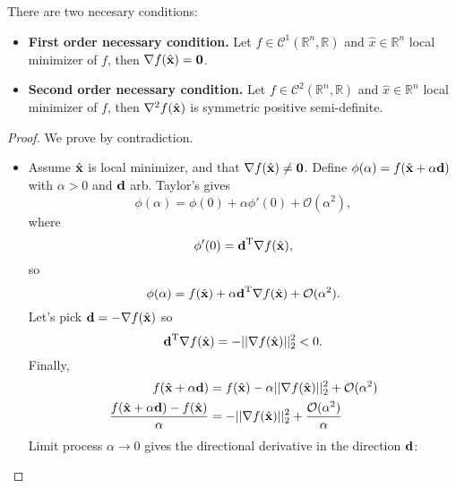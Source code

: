 \documentclass{article}
\begin{document}
\begin{theorem}
There are two necesary conditions:
    \begin{itemize}
        \item \textbf{First order necessary condition.} Let $f\in\mathcal{C}^1(\mathbb{R}^n,\mathbb{R})$ and $\hat{x}\in\mathbb{R}^n$ local minimizer of $f$, then $\nabla f(\hat{\bm{\mathrm{x}}})=\bm{\mathrm{0}}$.
        \item \textbf{Second order necessary condition.} Let $f\in\mathcal{C}^2(\mathbb{R}^n,\mathbb{R})$ and $\hat{x}\in\mathbb{R}^n$ local minimizer of $f$, then $\nabla^2 f(\hat{\bm{\mathrm{x}}})$ is symmetric positive semi-definite.
    \end{itemize}
\end{theorem}
\begin{proof}
    We prove by contradiction.
    \begin{itemize}
        \item Assume $\hat{\bm{\mathrm{x}}}$ is local minimizer, and that $\nabla f(\hat{\bm{\mathrm{x}}})\neq\bm{\mathrm{0}}$. Define $\phi(\alpha)=f(\hat{\bm{\mathrm{x}}}+\alpha\bm{\mathrm{d}})$ with $\alpha>0$ and $\bm{\mathrm{d}}$ arb. Taylor's gives
        \begin{equation}
            \phi(\alpha)=\phi(0)+\alpha\phi'(0)+\mathcal{O}(\alpha^2),
        \end{equation}
        where
        \begin{equation}
            \phi'(0)=\bm{\mathrm{d}}^{\text{T}}\nabla f(\hat{\bm{\mathrm{x}}}),
        \end{equation}
        so
        \begin{equation}
            \phi(\alpha)=f(\hat{\bm{\mathrm{x}}})+\alpha \bm{\mathrm{d}}^{\text{T}}\nabla f(\hat{\bm{\mathrm{x}}})+\mathcal{O}(\alpha^2).
        \end{equation}
        Let's pick $\bm{\mathrm{d}}=-\nabla f(\hat{\bm{\mathrm{x}}})$ so
        \begin{equation}
            \bm{\mathrm{d}}^{\text{T}}\nabla f(\hat{\bm{\mathrm{x}}})=-||\nabla f(\hat{\bm{\mathrm{x}}})||_2^2<0.
        \end{equation}
        Finally,
        \begin{align}
            f(\hat{\bm{\mathrm{x}}}+\alpha\bm{\mathrm{d}})&=f(\hat{\bm{\mathrm{x}}})-\alpha ||\nabla f(\hat{\bm{\mathrm{x}}})||_2^2 +\mathcal{O}(\alpha^2)\\
            \frac{ f(\hat{\bm{\mathrm{x}}}+\alpha\bm{\mathrm{d}})-f(\hat{\bm{\mathrm{x}}})}{\alpha}&=- ||\nabla f(\hat{\bm{\mathrm{x}}})||_2^2 +\frac{\mathcal{O}(\alpha^2)}{\alpha}
        \end{align}
        Limit process $\alpha\rightarrow0$ gives the directional derivative in the direction $\bm{\mathrm{d}}$:

\end{itemize}
\end{proof}
\end{document}
